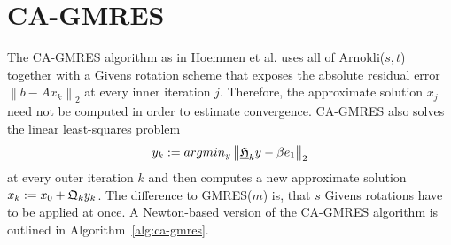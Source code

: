 \documentclass{scrartcl}
\numberwithin{equation}{section}
\newcommand{\norm}[1]{\left\lVert#1\right\rVert}
\begin{document}
\section{CA-GMRES} \label{sec:ca-gmres}
The CA-GMRES algorithm as in Hoemmen et al. \cite{Hoemmen:2010:CKS:1970638} uses all of Arnoldi($s,t$) together with a Givens rotation scheme that exposes the absolute residual error $\norm{b - Ax_k}_2$ at every inner iteration $j$. Therefore, the approximate solution $x_j$ need not be computed in order to estimate convergence. CA-GMRES also solves the linear least-squares problem 
\begin{equation*}
	y_k := argmin_y \norm{\underline{\frak{H}}_k y - \beta e_1}_2
\end{equation*}
at every outer iteration $k$ and then computes a new approximate solution $x_k := x_0 + \frak{Q}_k y_k$. The difference to GMRES($m$) is, that $s$ Givens rotations have to be applied at once. A Newton-based version of the CA-GMRES algorithm is outlined in Algorithm~\ref{alg:ca-gmres}.

\end{document}
